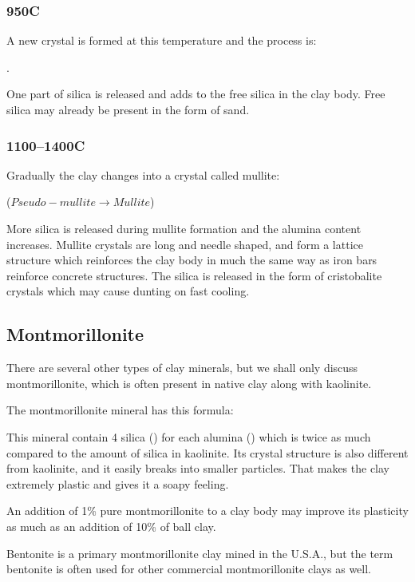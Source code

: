 \subsubsection{950\degree C}
A new crystal is formed at this temperature and the process is:

. 

One part of silica is released and adds to the free silica in the clay body. 
Free silica may already be present in the form of sand.
\subsubsection{1100--1400\degree C}

Gradually the clay changes into a crystal called mullite:


($Pseudo-mullite \rightarrow Mullite$) 

More silica is released during mullite formation and the alumina content 
increases. Mullite crystals are long and needle shaped, and form a lattice 
structure which reinforces the clay body in much the same way as iron bars 
reinforce concrete structures. The silica is released in the form of 
cristobalite crystals which may cause dunting on fast cooling.
\subsection{Montmorillonite}
There are several other types of clay minerals, but we shall only discuss 
montmorillonite, which is often present in native clay along with kaolinite.

The montmorillonite mineral has this formula: 

This mineral contain 4 silica () for each alumina () which 
is twice as much compared to the amount of silica in kaolinite. Its crystal 
structure is also different from kaolinite, and it easily breaks into smaller 
particles. That makes the clay extremely plastic and gives it a soapy feeling. 

An addition of 1\% pure montmorillonite to a clay body may improve its 
plasticity as much as an addition of 10\% of ball clay. 

Bentonite is a primary montmorillonite clay mined in the U.S.A., but the term 
bentonite is often used for other commercial montmorillonite clays as well.

